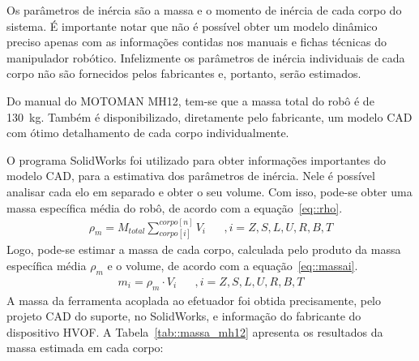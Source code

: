 Os parâmetros de inércia são a massa e o momento de inércia de cada corpo do
sistema. É importante notar que não é possível obter um modelo dinâmico preciso
apenas com as informações contidas nos manuais e fichas técnicas do manipulador
robótico. Infelizmente os parâmetros de inércia individuais de cada corpo não
são fornecidos pelos fabricantes e, portanto, serão estimados. 

Do manual do MOTOMAN MH12, tem-se que a massa
total do robô é de 130~kg. Também é disponibilizado, diretamente pelo
fabricante, um modelo CAD com ótimo detalhamento de cada corpo individualmente.

O programa SolidWorks foi utilizado para obter informações importantes do modelo
CAD, para a estimativa dos parâmetros de inércia. Nele é possível analisar cada
elo em separado e obter o seu volume. Com isso, pode-se obter uma massa específica
média do robô, de acordo com a equação~\ref{eq::rho}.
%
\begin{align}
	\rho_{m} = M_{total}\sum_{corpo[i]}^{corpo[n]} V_{i} \label{eq::rho} & &, i =
	Z,S,L,U,R,B,T
\end{align}
%
Logo, pode-se estimar a massa de cada corpo, calculada pelo produto da massa
específica média $\rho_{m}$ e o volume, de acordo com a
equação~\ref{eq::massai}.
%
\begin{align}
	m_{i} = \rho_{m} \cdot V_{i} \label{eq::massai} & &, i =
	Z,S,L,U,R,B,T
\end{align}
%
A massa da ferramenta acoplada ao efetuador foi obtida precisamente, pelo
projeto CAD do suporte, no SolidWorks, e informação do fabricante do dispositivo
HVOF.
A Tabela~\ref{tab::massa_mh12} apresenta os resultados da massa estimada em cada
corpo:
%
